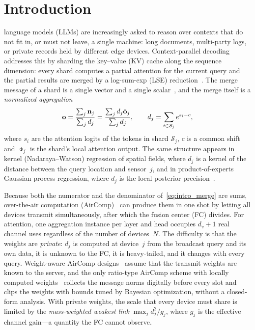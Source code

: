 \section{Introduction}
\label{sec:intro}

 language models (LLMs) are increasingly asked to reason over contexts that do not fit in, or must not leave, a single machine: long documents, multi-party logs, or private records held by different edge devices. Context-parallel decoding addresses this by sharding the key--value (KV) cache along the sequence dimension: every shard computes a partial attention for the current query and the partial results are merged by a log-sum-exp (LSE) reduction~\cite{lin2024infinite,acharya2025star,bhatia2025helix,shyam2024tree}. The merge message of a shard is a single vector and a single scalar~\cite{acharya2025star}, and the merge itself is a \emph{normalized aggregation}
\begin{equation}
\mathbf{o}=\frac{\sum_{j}\mathbf{n}_j}{\sum_{j}d_j}=\frac{\sum_j d_j\bar{\mathbf{o}}_j}{\sum_j d_j},\qquad d_j=\sum_{i\in\mathcal{S}_j}e^{s_i-c},
\label{eq:intro_merge}
\end{equation}
where $s_i$ are the attention logits of the tokens in shard $\mathcal{S}_j$, $c$ is a common shift and $\obar_j$ is the shard's local attention output. The same structure appears in kernel (Nadaraya--Watson) regression of spatial fields, where $d_j$ is a kernel of the distance between the query location and sensor~$j$, and in product-of-experts Gaussian-process regression, where $d_j$ is the local posterior precision~\cite{sato2022gpr,sato2026awa}.

Because both the numerator and the denominator of~\eqref{eq:intro_merge} are sums, over-the-air computation (AirComp)~\cite{nazer2007computation,goldenbaum2015nomographic,sahin2023survey} can produce them in one shot by letting all devices transmit simultaneously, after which the fusion center (FC) divides. For attention, one aggregation instance per layer and head occupies $d_v+1$ real channel uses regardless of the number of devices~$N$. The difficulty is that the weights are \emph{private}: $d_j$ is computed at device~$j$ from the broadcast query and its own data, it is unknown to the FC, it is heavy-tailed, and it changes with every query. Weight-aware AirComp designs~\cite{cao2020power,liu2020scaling,yang2026airmoe,zhang2026logit} assume that the transmit weights are known to the server, and the only ratio-type AirComp scheme with locally computed weights~\cite{sato2026awa} collects the message norms digitally before every slot and clips the weights with bounds tuned by Bayesian optimization, without a closed-form analysis. With private weights, the scale that every device must share is limited by the \emph{mass-weighted weakest link} $\max_j d_j^2/g_j$, where $g_j$ is the effective channel gain---a quantity the FC cannot observe.

